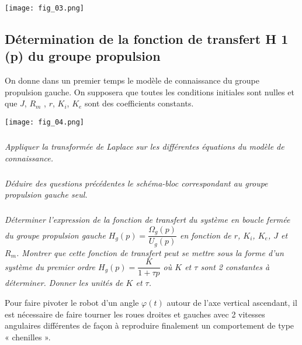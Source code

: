 \begin{multicols}{2}
\begin{center}
\texttt{[image: fig\_03.png]}
\end{center}
\fi


\subsection*{Détermination de la fonction de transfert H 1 (p) du groupe propulsion}
\ifprof
\else
On donne dans un premier temps le modèle de connaissance du groupe propulsion gauche. On supposera que toutes les conditions initiales sont nulles et que  $J$,  $R_m$ , $r$, $K_i$, $K_e$ sont des coefficients constants.

\begin{center}
\texttt{[image: fig\_04.png]}
\end{center}
\fi

\subparagraph{}
\textit{Appliquer la transformée de Laplace sur les différentes équations du modèle de connaissance.}
\ifprof
\begin{corrige}
\end{corrige}
\else
\fi


\subparagraph{}
\textit{Déduire des questions précédentes le schéma-bloc correspondant au groupe propulsion gauche seul. }
\ifprof
\begin{corrige}
\end{corrige}
\else
\fi

\subparagraph{}
\textit{Déterminer l’expression de la fonction de transfert du système en boucle fermée du groupe propulsion gauche 
$H_g (p) =\dfrac{\Omega_g(p)}{U_g(p)}$ en fonction de $r$, $K_i$, $K_e$, $J$ et $R_m$. Montrer que cette fonction de
transfert peut se mettre sous la forme d’un système du premier ordre $H_g(p)=\dfrac{K}{1+\tau p}$  où $K$ et $\tau$ sont 2
constantes à déterminer. Donner les unités de $K$ et $\tau$. 
} 

\ifprof
\begin{corrige}
\end{corrige}
\else
\fi
\ifprof
\else
Pour faire pivoter le robot d’un angle $\varphi(t)$ autour de l’axe vertical ascendant, il est nécessaire de faire tourner les roues droites et gauches avec 2 vitesses angulaires différentes de façon à reproduire finalement un comportement de type « chenilles ». 


\end{multicols}
